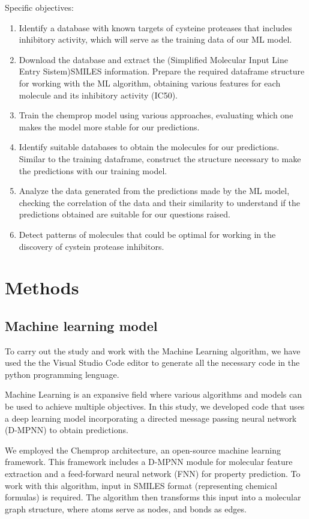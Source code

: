 \documentclass[final,times,twocolumn,article]{elsarticle}
\begin{document}
Specific objectives:

\begin{enumerate}
    \item Identify a database with known targets of cysteine proteases that includes inhibitory activity, which will serve as the training data of our ML model. 
    \item Download the database and extract the (Simplified Molecular Input Line Entry Sistem)SMILES information. Prepare the required dataframe structure for working with the ML algorithm, obtaining various features for each molecule and its inhibitory activity (IC50).
    \item Train the chemprop model using various approaches, evaluating which one makes the model more stable for our predictions. 
    \item Identify suitable databases to obtain the molecules for our predictions. Similar to the training dataframe, construct the structure necessary to make the predictions with our training model. 
    \item Analyze the data generated from the predictions made by the ML model, checking the correlation of the data and their similarity to understand if the predictions obtained are suitable for our questions raised. 
    \item Detect patterns of molecules that could be optimal for working in the discovery of cystein protease inhibitors. 
\end{enumerate}

\section{Methods}

\subsection{Machine learning model}

To carry out the study and work with the Machine Learning algorithm, we have used the the Visual Studio Code editor to generate all the necessary code in the python programming lenguage. 

Machine Learning is an expansive field where various algorithms and models can be used to achieve multiple objectives. In this study, we developed code that uses a deep learning model incorporating a directed message passing neural network (D-MPNN) to obtain predictions. 

We employed the Chemprop architecture, an open-source machine learning framework. This framework includes a D-MPNN module for molecular feature extraction and a feed-forward neural network (FNN) for property prediction. To work with this algorithm, input in SMILES format (representing chemical formulas) is required. The algorithm then transforms this input into a molecular graph structure, where atoms serve as nodes, and bonds as edges. 
\end{document}
